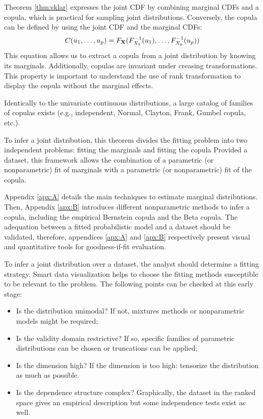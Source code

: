 Theorem \ref{thm:sklar} expresses the joint CDF by combining marginal CDFs and a copula, which is practical for sampling joint distributions. 
Conversely, the copula can be defined by using the joint CDF and the marginal CDFs: 
\begin{equation}
    C(u_1, \dots, u_p) = F_{{\bf X}}(F^{-1}_{X_1}(u_1), \dots, F^{-1}_{X_p}(u_p))
\end{equation}
This equation allows us to extract a copula from a joint distribution by knowing its marginals.
Additionally, copulas are invariant under creasing transformations. 
This property is important to understand the use of rank transformation to display the copula without the marginal effects.     


Identically to the univariate continuous distributions, a large catalog of families of copulas exists (e.g., independent, Normal, Clayton, Frank, Gumbel copula, etc.).


To infer a joint distribution, this theorem divides the fitting problem into two independent problems: fitting the marginals and fitting the copula
Provided a dataset, this framework allows the combination of a parametric (or nonparametric) fit of marginals with a parametric (or nonparametric) fit of the copula. 

Appendix \ref{apx:A} details the main techniques to estimate marginal distributions. 
Then, Appendix \ref{apx:B} introduces different nonparametric methods to infer a copula, including the empirical Bernstein copula and the Beta copula. 
The adequation between a fitted probabilistic model and a dataset should be validated, therefore, appendices \ref{apx:A} and \ref{apx:B} respectively present visual and quantitative tools for goodness-if-fit evaluation.

To infer a joint distribution over a dataset, the analyst should determine a fitting strategy.
Smart data visualization helps to choose the fitting methods susceptible to be relevant to the problem. 
The following points can be checked at this early stage: 
\begin{itemize}
    \item Is the distribution unimodal? If not, mixtures methods or nonparametric models might be required;
    \item Is the validity domain restrictive? If so, specific families of parametric distributions can be chosen or truncations can be applied;
    \item Is the dimension high? If the dimension is too high: tensorize the distribution as much as possible.
    \item Is the dependence structure complex? Graphically, the dataset in the ranked space gives an empirical description but some independence tests exist as well. 
\end{itemize} 



